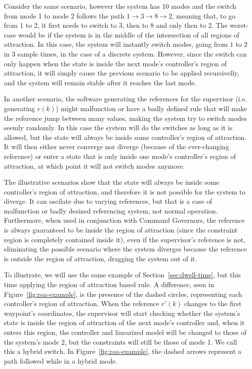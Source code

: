 Consider the same scenario, however the system has 10 modes and the switch from
mode 1 to mode 2 follows the path \(1 \rightarrow 3 \rightarrow 8 \rightarrow 2\), meaning that, to go from
\(1\) to \(2\), it first needs to switch to \(3\), then to \(8\) and only then
to \(2\). The worst-case would be if the system is in the middle of the
intersection of all regions of attraction. In this case, the system will
instantly switch modes, going from \(1\) to \(2\) in \(3\) sample times, in the
case of a discrete system. However, since the switch can only happen when the
state is inside the next mode's controller's region of attraction, it will
simply cause the previous scenario to be applied recursivelly, and the system
will remain stable after it reaches the last mode.

In another scenario, the software generating the references for the supervisor
(i.e. generating \(r(k)\)) might malfunction or have a badly defined rule that
will make the reference jump between many values, making the system try to
switch modes seemly randomly. In this case the system will do the switches as
long as it is allowed, but the state will always be inside some controller's
region of attraction. It will then either never converge nor diverge (because of
the ever-changing reference) or enter a state that is only inside one mode's
controller's region of attraction, at which point it will not switch modes
anymore.

The illustrative scenarios show that the state will always be inside some
controller's region of attraction, and therefore it is not possible for the
system to diverge. It can oscilate due to varying references, but that is a case
of malfunction or badly desined referencing system, not normal operation.
Furthermore, when used in conjunction with Command Governors, the reference is
always guaranteed to be inside the region of attraction (since the constraint
region is completely contained inside it), even if the supervisor's reference is
not, eliminating the possible scenario where the system diverges because the
reference is outside the region of attraction, dragging the system out of it.

To illustrate, we will use the same example of Section~\ref{sec:dwell-time}, but
this time applying the region of attraction based rule. A difference, seen in
Figure~\ref{fig:roa-example}, is the presence of the dashed circles,
representing each controller's region of attraction. When the reference
\(r'(k)\) changes to the first waypoint's coordinates, the supervisor will start
checking whether the system's state is inside the region of attraction of the
next mode's controller and, when it enters this region, the controller and
linearized model will be changed to those of the system's mode 2, but the
constraints will still be those of mode 1. We call this a hybrid switch. In
Figure~\ref{fig:roa-example}, the dashed arrows represent a path followed while
in a hybrid mode.

